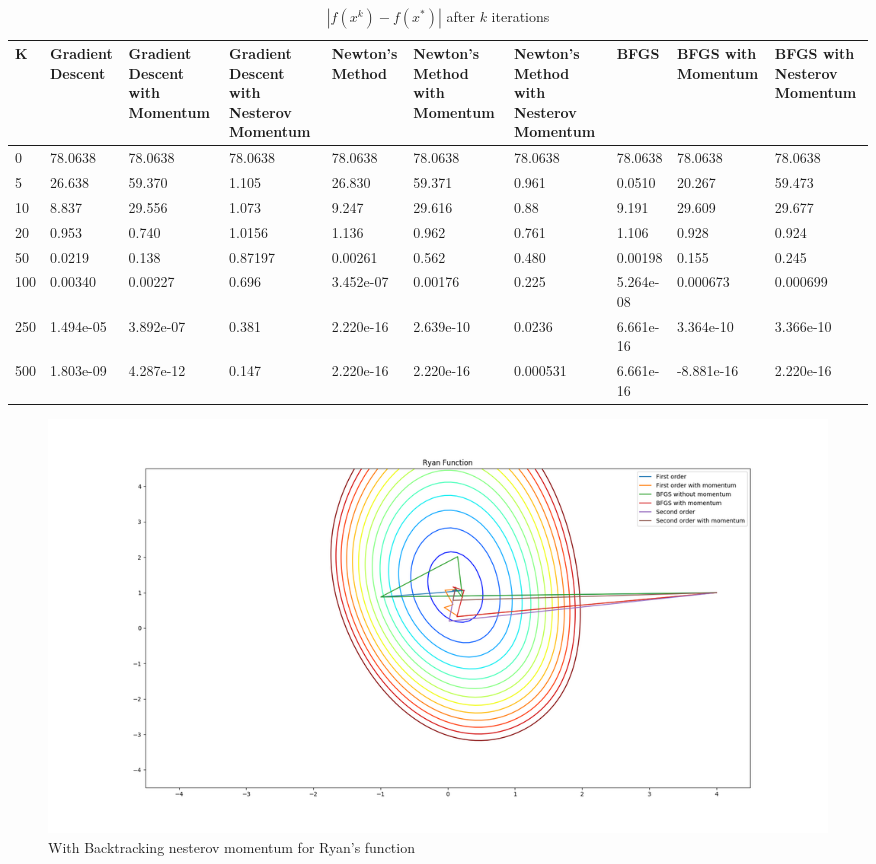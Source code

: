 \documentclass{article}
\begin{document}
\begin{center}
\begin{table}[H]
	\centering
	\caption{$ | f(x^k) - f(x^*) | $ after $k$ iterations}
	\label{Ryan function table}
	\begin{tabular}{|l|p{1.2cm}|p{1.2cm}|p{1.2cm}|p{1.2cm}|p{1.2cm}|p{1.2cm}|p{1.2cm}|p{1.2cm}|p{1.2cm}|}
		\hline
		K & Gradient Descent & Gradient Descent with Momentum & Gradient Descent with Nesterov Momentum & Newton's Method & Newton's Method with Momentum & Newton's Method with Nesterov Momentum & BFGS & BFGS with Momentum & BFGS with Nesterov Momentum \\
		\hline
		0 & 78.0638 & 78.0638 & 78.0638 & 78.0638 & 78.0638 & 78.0638 & 78.0638 & 78.0638 & 78.0638 \\
		\hline
		5 & 26.638 & 59.370 & 1.105 & 26.830 & 59.371 & 0.961 & 0.0510 & 20.267 & 59.473 \\
		\hline
		10 & 8.837 & 29.556 & 1.073 & 9.247 & 29.616 & 0.88 & 9.191 & 29.609 & 29.677 \\
		\hline
		20 & 0.953 & 0.740 & 1.0156 & 1.136 & 0.962 & 0.761 & 1.106 & 0.928 & 0.924 \\
		\hline
		50 & 0.0219 & 0.138 & 0.87197 & 0.00261 & 0.562 & 0.480 & 0.00198 & 0.155 & 0.245 \\
		\hline
		100 & 0.00340 & 0.00227 & 0.696 & 3.452e-07 & 0.00176 & 0.225 & 5.264e-08 & 0.000673 & 0.000699 \\
		\hline
		250 & 1.494e-05 & 3.892e-07 & 0.381 & 2.220e-16 & 2.639e-10 & 0.0236 & 6.661e-16 & 3.364e-10 & 3.366e-10 \\
		\hline
		500 & 1.803e-09 & 4.287e-12 & 0.147 & 2.220e-16 & 2.220e-16 & 0.000531 & 6.661e-16 & -8.881e-16 & 2.220e-16 \\
		\hline
	\end{tabular}
\end{table}

\begin{figure}[H]
	\includegraphics[width=\linewidth]{../Images/ryanbacktrack.png}
	\caption{With Backtracking nesterov momentum for Ryan's function}
	\label{fig:With Backtracking nesterov momentum for Ryan's function}
\end{figure}


\end{center}
\end{document}
